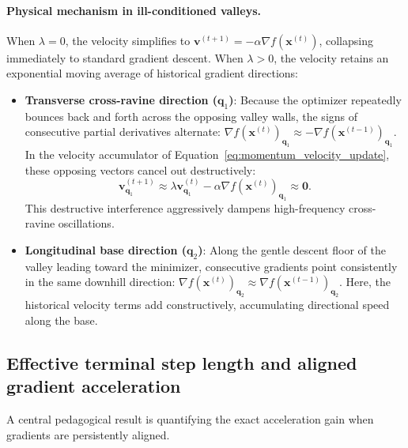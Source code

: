 \paragraph{Physical mechanism in ill-conditioned valleys.}
When $\lambda = 0$, the velocity simplifies to $\mathbf{v}^{(t+1)} = -\alpha \nabla f(\mathbf{x}^{(t)})$, collapsing immediately to standard gradient descent. 
When $\lambda > 0$, the velocity retains an exponential moving average of historical gradient directions:
\begin{itemize}[noitemsep]
  \item \textbf{Transverse cross-ravine direction ($\mathbf{q}_1$)}: Because the optimizer repeatedly bounces back and forth across the opposing valley walls, the signs of consecutive partial derivatives alternate: $\nabla f(\mathbf{x}^{(t)})_{\mathbf{q}_1} \approx -\nabla f(\mathbf{x}^{(t-1)})_{\mathbf{q}_1}$. In the velocity accumulator of Equation~\eqref{eq:momentum_velocity_update}, these opposing vectors cancel out destructively:
  \begin{equation}
  \mathbf{v}^{(t+1)}_{\mathbf{q}_1} \approx \lambda \mathbf{v}^{(t)}_{\mathbf{q}_1} - \alpha \nabla f(\mathbf{x}^{(t)})_{\mathbf{q}_1} \approx \mathbf{0}.
  \end{equation}
  This destructive interference aggressively dampens high-frequency cross-ravine oscillations.
  \item \textbf{Longitudinal base direction ($\mathbf{q}_2$)}: Along the gentle descent floor of the valley leading toward the minimizer, consecutive gradients point consistently in the same downhill direction: $\nabla f(\mathbf{x}^{(t)})_{\mathbf{q}_2} \approx \nabla f(\mathbf{x}^{(t-1)})_{\mathbf{q}_2}$. Here, the historical velocity terms add constructively, accumulating directional speed along the base.
\end{itemize}

\subsection{Effective terminal step length and aligned gradient acceleration}
\label{sec:aligned_gradient_acceleration}

A central pedagogical result is quantifying the exact acceleration gain when gradients are persistently aligned.

